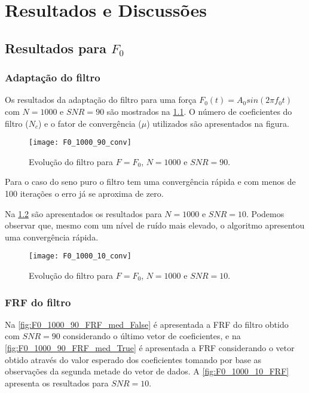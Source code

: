 \chapter{Resultados e Discussões}

\section{Resultados para $ F_0 $}\label{sec_F_0}
\subsection{Adaptação do filtro}

Os resultados da adaptação do filtro para uma força $F_0(t) = A_0 sin(2\pi f_0 t)$ com $ N=1000 $  e $ SNR = 90 $ são mostrados na \cref{fig:F0_1000_90_conv}. O número de coeficientes do filtro ($ N_c $) e o fator de convergência ($ \mu $) utilizados são apresentados na figura.

\begin{figure}[!h]
	\centering
	\texttt{[image: F0\_1000\_90\_conv]}
	\caption{Evolução do filtro para $ F=F_0 $, $ N=1000 $ e $ SNR=90 $.}
	\label{fig:F0_1000_90_conv}
\end{figure}

Para o caso do seno puro o filtro tem uma convergência rápida e com menos de 100 iterações o erro já se aproxima de zero. 

Na \cref{fig:F0_1000_10_conv} são apresentados os resultados para $ N=1000 $ e $ SNR=10 $. Podemos observar que, mesmo com um nível de ruído mais elevado, o algoritmo apresentou uma convergência rápida.

\begin{figure}
	\centering
	\texttt{[image: F0\_1000\_10\_conv]}
	\caption{Evolução do filtro para $ F=F_0 $, $ N=1000 $ e $ SNR=10 $.}
	\label{fig:F0_1000_10_conv}
\end{figure}

\subsection{FRF do filtro}

Na \cref{fig:F0_1000_90_FRF_med_False} é apresentada a FRF do filtro obtido com $ SNR=90 $ considerando o último vetor de coeficientes, e na \cref{fig:F0_1000_90_FRF_med_True} é apresentada a FRF considerando o vetor obtido através do valor esperado dos coeficientes tomando por base as observações da segunda metade do vetor de dados. A \cref{fig:F0_1000_10_FRF} apresenta os resultados para $ SNR=10 $. 

